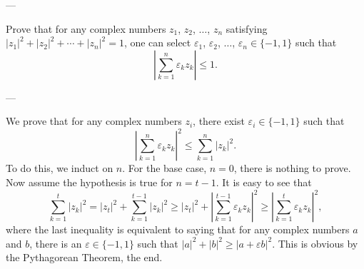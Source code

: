 
---

Prove that for any complex numbers $z_1$, $z_2$, $\ldots$, $z_n$ satisfying $|z_1|^2+|z_2|^2+\cdots+|z_n|^2=1$, one can select $\varepsilon_1$, $\varepsilon_2$, $\ldots$, $\varepsilon_n\in\{-1,1\}$ such that \[\left\lvert\sum_{k=1}^n\varepsilon_kz_k\right\rvert\le1.\]

---

We prove that for any complex numbers $z_i$, there exist $\varepsilon_i\in\{-1,1\}$ such that \[\left\lvert\sum_{k=1}^n\varepsilon_kz_k\right\rvert^2\le\sum_{k=1}^n\left\lvert z_k\right\rvert^2.\]
To do this, we induct on $n$. For the base case, $n=0$, there is nothing to prove. Now assume the hypothesis is true for $n=t-1$. It is easy to see that \[\sum_{k=1}^t\left\lvert z_k\right\rvert^2=\left\lvert z_t\right\rvert^2+\sum_{k=1}^{t-1}\left\lvert z_k\right\rvert^2\ge\left\lvert z_t\right\rvert^2+\left\lvert\sum_{k=1}^{t-1}\varepsilon_kz_k\right\rvert^2\ge\left\lvert\sum_{k=1}^t\varepsilon_kz_k\right\rvert^2,\]
where the last inequality is equivalent to saying that for any complex numbers $a$ and $b$, there is an $\varepsilon\in\{-1,1\}$ such that $\left\lvert a\right\rvert^2+\left\lvert b\right\rvert^2\ge\left\lvert a+\varepsilon b\right\rvert^2$. This is obvious by the Pythagorean Theorem, the end.
